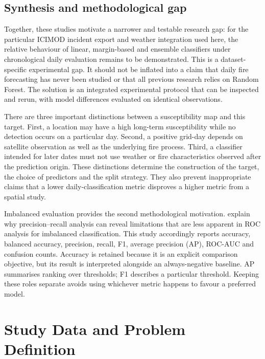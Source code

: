 \documentclass[conference,a4paper]{IEEEtran}
\begin{document}
\subsection{Synthesis and methodological gap}
Together, these studies motivate a narrower and testable research gap: for the particular ICIMOD incident export and weather integration used here, the relative behaviour of linear, margin-based and ensemble classifiers under chronological daily evaluation remains to be demonstrated. This is a dataset-specific experimental gap. It should not be inflated into a claim that daily fire forecasting has never been studied or that all previous research relies on Random Forest. The solution is an integrated experimental protocol that can be inspected and rerun, with model differences evaluated on identical observations.

There are three important distinctions between a susceptibility map and this target. First, a location may have a high long-term susceptibility while no detection occurs on a particular day. Second, a positive grid-day depends on satellite observation as well as the underlying fire process. Third, a classifier intended for later dates must not use weather or fire characteristics observed after the prediction origin. These distinctions determine the construction of the target, the choice of predictors and the split strategy. They also prevent inappropriate claims that a lower daily-classification metric disproves a higher metric from a spatial study.

Imbalanced evaluation provides the second methodological motivation. \citet{saito} explain why precision--recall analysis can reveal limitations that are less apparent in ROC analysis for imbalanced classification. This study accordingly reports accuracy, balanced accuracy, precision, recall, F1, average precision (AP), ROC-AUC and confusion counts. Accuracy is retained because it is an explicit comparison objective, but its result is interpreted alongside an always-negative baseline. AP summarises ranking over thresholds; F1 describes a particular threshold. Keeping these roles separate avoids using whichever metric happens to favour a preferred model.

\section{Study Data and Problem Definition}
\end{document}
